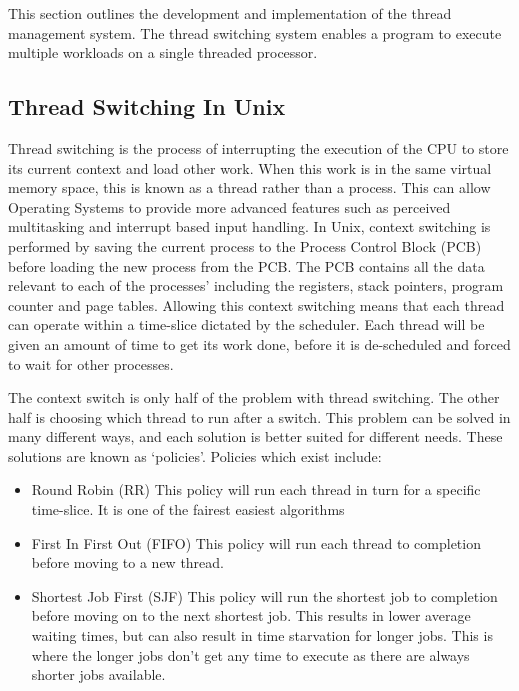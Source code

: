 This section outlines the development and implementation of the thread management system. The thread switching system enables a program to execute multiple workloads on a single threaded processor.
\subsection{Thread Switching In Unix}
Thread switching is the process of interrupting the execution of the CPU to store its current context and load other work. When this work is in the same virtual memory space, this is known as a thread rather than a process. This can allow Operating Systems to provide more advanced features such as perceived multitasking and interrupt based input handling. In Unix, context switching is performed by saving the current process to the Process Control Block (PCB) before loading the new process from the PCB. The PCB contains all the data relevant to each of the processes' including the registers, stack pointers, program counter and page tables. Allowing this context switching means that each thread can operate within a time-slice dictated by the scheduler. Each thread will be given an amount of time to get its work done, before it is de-scheduled and forced to wait for other processes.

The context switch is only half of the problem with thread switching. The other half is choosing which thread to run after a switch. This problem can be solved in many different ways, and each solution is better suited for different needs. These solutions are known as `policies'. Policies which exist include:

\begin{itemize}
	\item Round Robin (RR)
		  This policy will run each thread in turn for a specific time-slice. It is one of the fairest easiest algorithms
	\item First In First Out (FIFO)
	 	  This policy will run each thread to completion before moving to a new thread. 
	\item Shortest Job First (SJF)
		  This policy will run the shortest job to completion before moving on to the next shortest job. This results in lower average waiting times, but can also result in time starvation for longer jobs. This is where the longer jobs don't get any time to execute as there are always shorter jobs available. 
\end{itemize}



